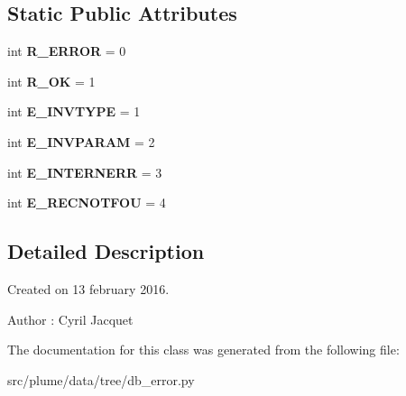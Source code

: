 \subsection*{Static Public Attributes}
\begin{DoxyCompactItemize}
\item 
int {\bfseries R\+\_\+\+E\+R\+R\+OR} = 0\hypertarget{classplume-creator_1_1src_1_1plume_1_1data_1_1tree_1_1db__error_1_1_db_error_abc9cd2be8630af4b8ac1dd5d76f3e73c}{}\label{classplume-creator_1_1src_1_1plume_1_1data_1_1tree_1_1db__error_1_1_db_error_abc9cd2be8630af4b8ac1dd5d76f3e73c}

\item 
int {\bfseries R\+\_\+\+OK} = 1\hypertarget{classplume-creator_1_1src_1_1plume_1_1data_1_1tree_1_1db__error_1_1_db_error_a7d54a655eda3469b58cc39dfd6ec3be5}{}\label{classplume-creator_1_1src_1_1plume_1_1data_1_1tree_1_1db__error_1_1_db_error_a7d54a655eda3469b58cc39dfd6ec3be5}

\item 
int {\bfseries E\+\_\+\+I\+N\+V\+T\+Y\+PE} = 1\hypertarget{classplume-creator_1_1src_1_1plume_1_1data_1_1tree_1_1db__error_1_1_db_error_adaae6a244713ed04364cd6fc05b2c924}{}\label{classplume-creator_1_1src_1_1plume_1_1data_1_1tree_1_1db__error_1_1_db_error_adaae6a244713ed04364cd6fc05b2c924}

\item 
int {\bfseries E\+\_\+\+I\+N\+V\+P\+A\+R\+AM} = 2\hypertarget{classplume-creator_1_1src_1_1plume_1_1data_1_1tree_1_1db__error_1_1_db_error_a37d26795a204110660e81cd0f47d65df}{}\label{classplume-creator_1_1src_1_1plume_1_1data_1_1tree_1_1db__error_1_1_db_error_a37d26795a204110660e81cd0f47d65df}

\item 
int {\bfseries E\+\_\+\+I\+N\+T\+E\+R\+N\+E\+RR} = 3\hypertarget{classplume-creator_1_1src_1_1plume_1_1data_1_1tree_1_1db__error_1_1_db_error_abc590e7000a3e8f6996fef57cad08075}{}\label{classplume-creator_1_1src_1_1plume_1_1data_1_1tree_1_1db__error_1_1_db_error_abc590e7000a3e8f6996fef57cad08075}

\item 
int {\bfseries E\+\_\+\+R\+E\+C\+N\+O\+T\+F\+OU} = 4\hypertarget{classplume-creator_1_1src_1_1plume_1_1data_1_1tree_1_1db__error_1_1_db_error_a56a2df863bb872ae14b8224ec1beda8c}{}\label{classplume-creator_1_1src_1_1plume_1_1data_1_1tree_1_1db__error_1_1_db_error_a56a2df863bb872ae14b8224ec1beda8c}

\end{DoxyCompactItemize}


\subsection{Detailed Description}
Created on 13 february 2016. 

\begin{DoxyAuthor}{Author}
\+: Cyril Jacquet 
\end{DoxyAuthor}


The documentation for this class was generated from the following file\+:\begin{DoxyCompactItemize}
\item 
src/plume/data/tree/db\+\_\+error.\+py\end{DoxyCompactItemize}
